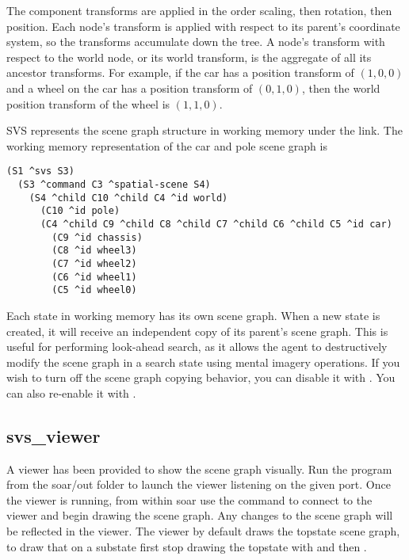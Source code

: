 The component transforms are applied in the order scaling, then rotation, then position.
Each node's transform is applied with respect to its parent's coordinate system, so the transforms accumulate down the tree.
A node's transform with respect to the world node, or its world transform, is the aggregate of all its ancestor transforms.
For example, if the car has a position transform of $(1,0,0)$ and a wheel on the car has a position transform of $(0,1,0)$, then the world position transform of the wheel is $(1,1,0)$.

SVS represents the scene graph structure in working memory under the  link.
The working memory representation of the car and pole scene graph is

\begin{verbatim}
(S1 ^svs S3)
  (S3 ^command C3 ^spatial-scene S4)
    (S4 ^child C10 ^child C4 ^id world)
      (C10 ^id pole)
      (C4 ^child C9 ^child C8 ^child C7 ^child C6 ^child C5 ^id car)
        (C9 ^id chassis)
        (C8 ^id wheel3)
        (C7 ^id wheel2)
        (C6 ^id wheel1)
        (C5 ^id wheel0)
\end{verbatim}

Each state in working memory has its own scene graph.
When a new state is created, it will receive an independent copy of its parent's scene graph.
This is useful for performing look-ahead search, as it allows the agent to destructively modify the scene graph in a search state using mental imagery operations. If you wish to turn off the scene graph copying behavior, you can disable it with . You can also re-enable it with .


\subsection{svs\_viewer}

A viewer has been provided to show the scene graph visually.
Run the program  from the soar/out folder
to launch the viewer listening on the given port. Once the viewer is running,
from within soar use the command  to connect
to the viewer and begin drawing the scene graph. Any changes to the scene graph
will be reflected in the viewer. The viewer by default draws the topstate scene graph,
to draw that on a substate first stop drawing the topstate with
 and then .


